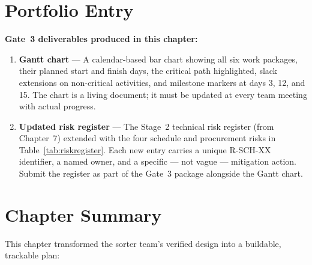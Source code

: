 \section*{Portfolio Entry}

\textbf{Gate~3 deliverables produced in this chapter:}
\begin{enumerate}
  \item[(a)] \textbf{Gantt chart} — A calendar-based bar chart showing
        all six work packages, their planned start and finish days, the
        critical path highlighted, slack extensions on non-critical
        activities, and milestone markers at days 3, 12, and 15.
        The chart is a living document; it must be updated at every
        team meeting with actual progress.

  \item[(b)] \textbf{Updated risk register} — The Stage~2 technical risk
        register (from Chapter~7) extended with the four schedule and
        procurement risks in Table~\ref{tab:riskregister}.
        Each new entry carries a unique R-SCH-XX identifier, a named
        owner, and a specific — not vague — mitigation action.
        Submit the register as part of the Gate~3 package
        alongside the Gantt chart.
\end{enumerate}

\section*{Chapter Summary}


This chapter transformed the sorter team's verified design into a buildable, trackable plan:

